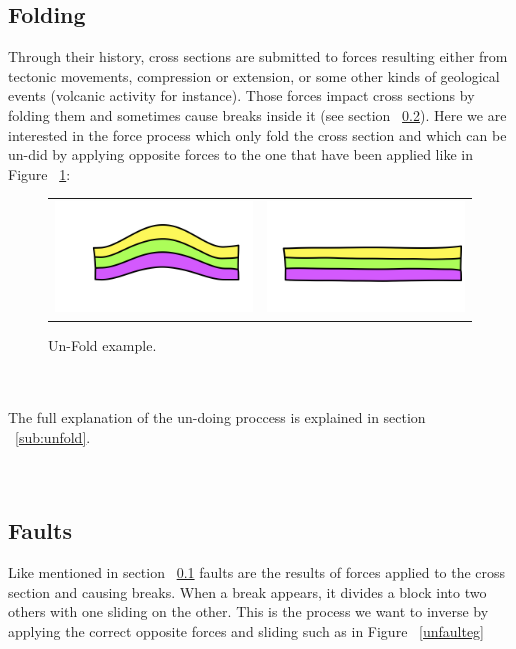 \documentclass[12pt, a4paper]{report} %
\begin{document}
\subsection{Folding}
\label{sub:fold}
Through their history, cross sections are submitted to forces resulting either from tectonic movements, compression or extension, or some other kinds of geological events (volcanic activity for instance). Those forces impact cross sections by folding them and sometimes cause breaks inside it (see section ~\ref{sub:fault}). Here we are interested in the force process which only fold the cross section and which can be un-did by applying opposite forces to the one that have been applied like in Figure ~\ref{unfoldeg}:
\begin{figure}[H]
\centering
\begin{tabular}{@{}cc@{}}
\includegraphics[width=.35\textwidth]{unFoldDescription0.png}&
\includegraphics[width=.35\textwidth]{unFoldDescription1.png}\\
\end{tabular}
\caption{Un-Fold example.}
\label{unfoldeg}
\end{figure}\\\\
The full explanation of the un-doing proccess is explained in section ~\ref{sub:unfold}.
\\\\\
\subsection{Faults}
\label{sub:fault}
Like mentioned in section ~\ref{sub:fold} faults are the results of forces applied to the cross section and causing breaks. When a break appears, it divides a block into two others with one sliding on the other. This is the process we want to inverse by applying the correct opposite forces and sliding such as in Figure ~\ref{unfaulteg}
\end{document}

